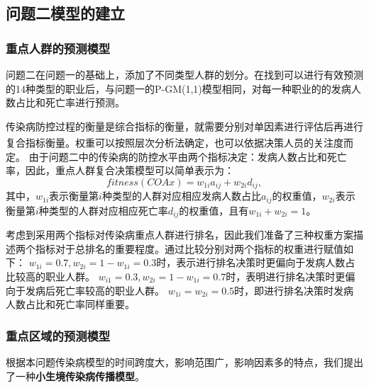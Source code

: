 \documentclass{whutmod}
\begin{document}
\subsection{问题二模型的建立}
\subsubsection{重点人群的预测模型}
问题二在问题一的基础上，添加了不同类型人群的划分。在找到可以进行有效预测的14种类型的职业后，与问题一的P-GM(1,1)模型相同，对每一种职业的的发病人数占比和死亡率进行预测。

传染病防控过程的衡量是综合指标的衡量，就需要分别对单因素进行评估后再进行复合指标衡量\textsuperscript{\cite{bib:eight}}。权重可以按照层次分析法确定，也可以依据决策人员的关注度而定。
由于问题二中的传染病的防控水平由两个指标决定：发病人数占比和死亡率，因此，重点人群复合决策模型可以简单表示为：
\begin{equation}
    fitness(COA x)=w_{1i}a_{ij}+w_{2i}d_{ij},
\end{equation}
其中，$w_{1i}$表示衡量第$i$种类型的人群对应相应发病人数占比$a_{ij}$的权重值，$w_{2i}$表示衡量第$i$种类型的人群对应相应死亡率$d_{ij}$的权重值，且有$w_{1i}+w_{2i}=1$。

考虑到采用两个指标对传染病重点人群进行排名，因此我们准备了三种权重方案描述两个指标对于总排名的重要程度。通过比较分别对两个指标的权重进行赋值如下：
$w_{1i}=0.7,w_{2i}=1-w_{1i}=0.3$时，表示进行排名决策时更偏向于发病人数占比较高的职业人群。
$w_{i1}=0.3,w_{2i}=1-w_{1i}=0.7$时，表明进行排名决策时更偏向于发病后死亡率较高的职业人群。
$w_{1i}=w_{2i}=0.5$时，即进行排名决策时发病人数占比和死亡率同样重要。

\subsubsection{重点区域的预测模型}
根据本问题传染病模型的时间跨度大，影响范围广，影响因素多的特点，我们提出了一种\textbf{小生境传染病传播模型}。
\end{document}
